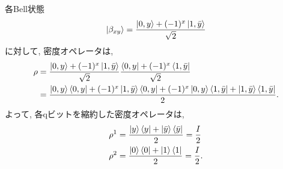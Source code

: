 \begin{ex}
    \label{ex2.75}
    各Bell状態
    \begin{align*}
        \ket{\beta_{xy}} = \frac{\ket{0,y}+ (-1)^x\ket{1,\bar{y}}}{\sqrt{2}}
    \end{align*}
    に対して, 密度オペレータは,
    \begin{align*}
        \rho
         & =
        \frac{\ket{0,y}+ (-1)^x\ket{1,\bar{y}}}{\sqrt{2}}
        \frac{\bra{0,y}+ (-1)^x\bra{1,\bar{y}}}{\sqrt{2}} \\
         & =
        \frac{
            \ket{0,y}\bra{0,y} + (-1)^x\ket{1,\bar{y}}\bra{0,y}
            +
            (-1)^x\ket{0,y}\bra{1,\bar{y}} + \ket{1,\bar{y}}\bra{1,\bar{y}}
        }{2}.
    \end{align*}
    よって, 各qビットを縮約した密度オペレータは,
    \begin{align*}
        \rho^1 & = \frac{\ket{y}\bra{y}  + \ket{\bar{y}}\bra{\bar{y}} }{2} = \frac{I}{2} \\
        \rho^2 & = \frac{ \ket{0}\bra{0} +  \ket{1}\bra{1}}{2} = \frac{I}{2}.
    \end{align*}
\end{ex}


